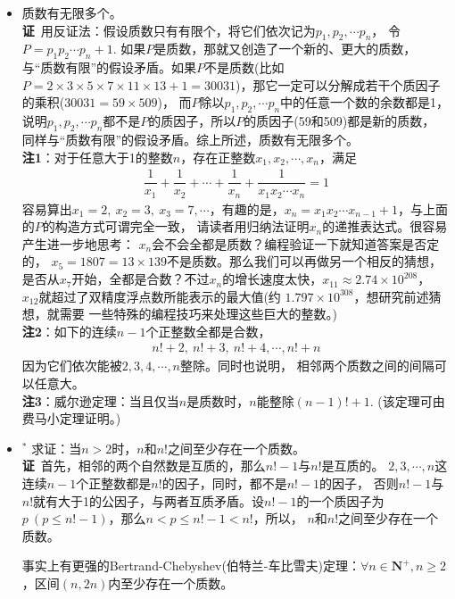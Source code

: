 \begin{itemize}[leftmargin=\inteval{\myitemleftmargin}pt,itemsep=
   \inteval{\myitemitempsep}pt,topsep=\inteval{\myitemtopsep}pt]
\item 质数有无限多个。\\
\textbf{证}\ 用反证法：假设质数只有有限个，将它们依次记为$ p_1,p_2,\cdots p_n $，
令$ P=p_1p_2\cdots p_n+1 $. 如果$ P $是质数，那就又创造了一个新的、更大的质数，
与“质数有限”的假设矛盾。如果$ P $不是质数(比如$ P = 2\times 3\times 5\times 7\times 11\times 13+1=30031 $)，那它一定可以分解成若干个质因子的乘积($ 30031=59\times 509 $)，
而$ P $除以$ p_1,p_2,\cdots p_n $中的任意一个数的余数都是1，
说明$ p_1,p_2,\cdots p_n $都不是$ P $的质因子，所以$ P $的质因子(59和509)都是新的质数，
同样与“质数有限”的假设矛盾。综上所述，质数有无限多个。\\
\textbf{注1}：对于任意大于1的整数$ n $，存在正整数$ x_1,x_2,\cdots,
x_n $，满足
\begin{align*}
    \dfrac{1}{x_1}+\dfrac{1}{x_2}+\cdots+\dfrac{1}{x_n}+
    \dfrac{1}{x_1x_2\cdots x_n}=1
\end{align*}
容易算出$ x_1=2,\ x_2=3,\ x_3=7,\cdots $，有趣的是，$ x_n=
x_1x_2\cdots x_{n-1}+1 $，与上面的$ P $的构造方式可谓完全一致，
请读者用归纳法证明$ x_n $的递推表达式。很容易产生进一步地思考：
$ x_n $会不会全都是质数？编程验证一下就知道答案是否定的，
$ x_5=1807=13\times 139 $不是质数。那么我们可以再做另一个相反的猜想，是否从$ x_7 $开始，全都是合数？不过$ x_n $的增长速度太快，$ x_{11}\approx 2.74\times 10^{208} $，
$ x_{12} $就超过了双精度浮点数所能表示的最大值(约
$ 1.797\times 10^{308} $，想研究前述猜想，就需要
一些特殊的编程技巧来处理这些巨大的整数。)\\
\textbf{注2}：如下的连续$ n-1 $个正整数全都是合数，
\begin{align*}
    n!+2,\ n!+3,\ n!+4,\cdots,n!+n
\end{align*}
因为它们依次能被$ 2,3,4,\cdots,n $整除。同时也说明，
相邻两个质数之间的间隔可以任意大。 \\
\textbf{注3}：威尔逊定理：当且仅当$ n $是质数时，$ n $能整除$ (n-1)!+1 $. (该定理可由费马小定理证明。) 

\item $ ^* $ 求证：当$ n>2 $时，$ n $和$ n! $之间至少存在一个质数。\\
\textbf{证}\ 首先，相邻的两个自然数是互质的，那么$ n!-1 $与$ n! $是互质的。
$ 2,3,\cdots,n $这连续$ n-1 $个正整数都是$ n! $的因子，同时，都不是$ n!-1 $的因子，
否则$ n!-1 $与$ n! $就有大于1的公因子，与两者互质矛盾。设$ n!-1 $的一个质因子为
$ p\ (p\leq n!-1) $，那么$ n<p\leq n!-1<n! $，所以，
$ n $和$ n! $之间至少存在一个质数。

事实上有更强的Bertrand-Chebyshev(伯特兰-车比雪夫)定理：$ \forall n\in \textbf{N}^+,n\geq 2 $，区间$ (n,2n) $内至少存在一个质数。


\end{itemize}

